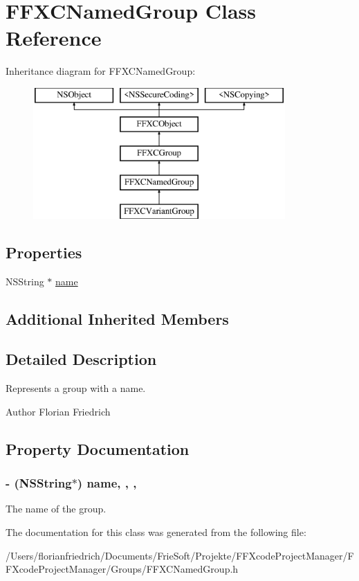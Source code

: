 \hypertarget{interface_f_f_x_c_named_group}{\section{F\-F\-X\-C\-Named\-Group Class Reference}
\label{interface_f_f_x_c_named_group}
}
Inheritance diagram for F\-F\-X\-C\-Named\-Group\-:\begin{figure}[H]
\begin{center}
\leavevmode
\includegraphics[height=5.000000cm]{interface_f_f_x_c_named_group}
\end{center}
\end{figure}
\subsection*{Properties}
\begin{DoxyCompactItemize}
\item 
N\-S\-String $\ast$ \hyperlink{interface_f_f_x_c_named_group_a4b93d352d2fca75b34e1b5a50e03f587}{name}
\end{DoxyCompactItemize}
\subsection*{Additional Inherited Members}


\subsection{Detailed Description}
Represents a group with a name. \begin{DoxyAuthor}{Author}
Florian Friedrich 
\end{DoxyAuthor}


\subsection{Property Documentation}
\hypertarget{interface_f_f_x_c_named_group_a4b93d352d2fca75b34e1b5a50e03f587}{
\subsubsection[{name}]{\setlength{\rightskip}{0pt plus 5cm}-\/ (N\-S\-String$\ast$) name\hspace{0.3cm}{\ttfamily [read]}, {\ttfamily [write]}, {\ttfamily [nonatomic]}, {\ttfamily [strong]}}}\label{interface_f_f_x_c_named_group_a4b93d352d2fca75b34e1b5a50e03f587}
The name of the group. 

The documentation for this class was generated from the following file\-:\begin{DoxyCompactItemize}
\item 
/\-Users/florianfriedrich/\-Documents/\-Frie\-Soft/\-Projekte/\-F\-F\-Xcode\-Project\-Manager/\-F\-F\-Xcode\-Project\-Manager/\-Groups/F\-F\-X\-C\-Named\-Group.\-h\end{DoxyCompactItemize}
